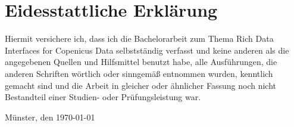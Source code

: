 \newpage
\thispagestyle{empty}
\section*{Eidesstattliche Erklärung}	%
\vspace{1cm}

Hiermit versichere ich, dass ich die Bachelorarbeit zum Thema Rich Data Interfaces for Copenicus Data selbstständig verfasst und keine anderen als die angegebenen Quellen 
und Hilfsmittel benutzt habe, alle Ausführungen, die anderen Schriften wörtlich oder sinngemäß entnommen wurden, kenntlich gemacht sind und die Arbeit in gleicher oder 
ähnlicher Fassung noch nicht Bestandteil einer Studien- oder Prüfungsleistung war. 

\vspace{3cm}

Münster, den \today